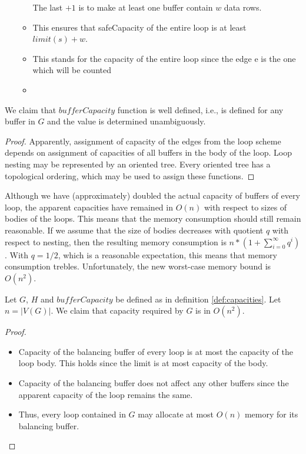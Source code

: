 \begin{itemize}
\begin{itemize}
        \textnormal{The last $+1$ is to make at least one buffer contain $w$ data rows.}

      \item {}
        
        This ensures that safeCapacity of the entire loop is at least $limit(s) + w$. 
      \item {}
        
        This stands for the capacity of the entire loop since the edge e is the one which will be counted
      \item {}
    \end{itemize}
  \end{itemize}
\myenddef

We claim that $bufferCapacity$ function is well defined, i.e., is defined for any buffer in $G$ and the value is determined unambiguously.
  \begin{proof}
    Apparently, assignment of capacity of the edges from the loop scheme depends on assignment of capacities of all buffers in the body of the loop. Loop nesting may be represented by an oriented tree. Every oriented tree has a topological ordering, which may be used to assign these functions.
  \end{proof}
\myendclaim

  Although we have (approximately) doubled the actual capacity of buffers of every loop, the apparent capacities have remained in $O(n)$ with respect to sizes of bodies of the loops. This means that the memory consumption should still remain reasonable. If we assume that the size of bodies decreases with quotient $q$ with respect to nesting, then the resulting memory consumption is $n*(1+\sum_{i=0}^{\infty}q^i)$. With $q=1/2$, which is a reasonable expectation, this means that memory consumption trebles. Unfortunately, the new worst-case memory bound is $O(n^2)$.

  Let $G$, $H$ and $bufferCapacity$ be defined as in definition \ref{def:capacities}. Let $n=| V(G) |$. We claim that capacity required by $G$ is in $O(n^2)$. 
  \begin{proof}\ 
    \begin{itemize}
      \item Capacity of the balancing buffer of every loop is at most the capacity of the loop body. This holds since the limit is at most capacity of the body.
      \item Capacity of the balancing buffer does not affect any other buffers since the apparent capacity of the loop remains the same.
      \item Thus, every loop contained in $G$ may allocate at most $O(n)$ memory for its balancing buffer.
    \end{itemize}
  \end{proof}
\myendclaim

